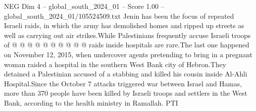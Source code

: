 \begin{textsample}{NEG Dim 4 – global\_south\_2024\_01 – Score 1.00 – global\_south\_2024\_01/105524509.txt}
Jenin has been the focus of repeated Israeli raids, in which the army has demolished homes and ripped up streets as well as carrying out air strikes.While Palestinians frequently accuse Israeli troops of @ @ @ @ @ @ @ @ @ @ raids inside hospitals are rare.The last one happened on November 12, 2015, when undercover agents pretending to bring in a pregnant woman raided a hospital in the southern West Bank city of Hebron.They detained a Palestinian accused of a stabbing and killed his cousin inside Al-Ahli Hospital.Since the October 7 attacks triggered war between Israel and Hamas, more than 370 people have been killed by Israeli troops and settlers in the West Bank, according to the health ministry in Ramallah.
PTI

\end{textsample}
